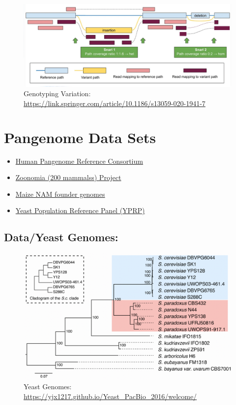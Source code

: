 \documentclass[
]{book}
\providecommand{\tightlist}{%
  \setlength{\itemsep}{0pt}\setlength{\parskip}{0pt}}
\begin{document}
\begin{figure}
\centering
\includegraphics[width=1\textwidth,height=\textheight]{./Figures/ReadsToVariation.png}
\caption{Genotyping Variation: \url{https://link.springer.com/article/10.1186/s13059-020-1941-7}}
\end{figure}

\hypertarget{pangenome-data-sets}{%
\section{Pangenome Data Sets}\label{pangenome-data-sets}}

\begin{itemize}
\tightlist
\item
  \href{https://humanpangenome.org}{Human Pangenome Reference Consortium}
\item
  \href{https://zoonomiaproject.org/the-data/}{Zoonomia (200 mammalss) Project}
\item
  \href{https://www.science.org/doi/10.1126/science.abg5289}{Maize NAM founder genomes}
\item
  \href{https://yjx1217.github.io/Yeast_PacBio_2016/welcome/}{Yeast Population Reference Panel (YPRP)}
\end{itemize}

\hypertarget{datayeast-genomes}{%
\subsection{Data/Yeast Genomes:}\label{datayeast-genomes}}

\begin{figure}
\centering
\includegraphics[width=1\textwidth,height=\textheight]{./Figures/Yeast.png}
\caption{Yeast Genomes: \url{https://yjx1217.github.io/Yeast_PacBio_2016/welcome/}}
\end{figure}
\end{document}
